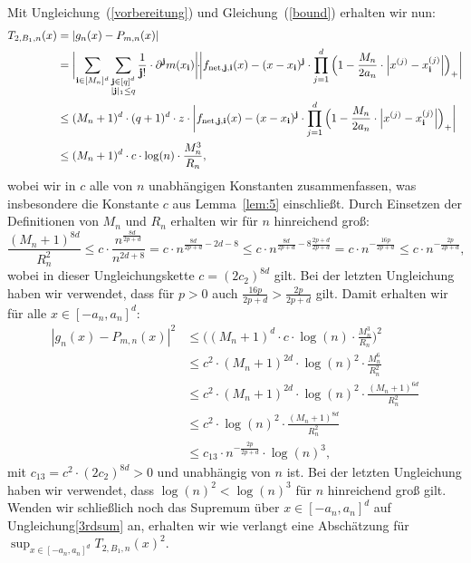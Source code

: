 Mit Ungleichung~(\ref{vorbereitung}) und Gleichung~(\ref{bound}) erhalten wir nun:
\begin{equation}
\label{1stsum}
\begin{split}
T_{2,B_1,n}(x) & = |g_n(x) - P_{m,n}(x)| \\
& = \bigg|\! \sum_{\mathbf{i} \in [M_n]^d} \sum_{\substack{ \mathbf{j} \in [q]^d \\ |\mathbf{j}|_1 \leq q}} \frac{1}{\mathbf{j}!} \cdot \partial^{\mathbf{j}} m (x_{\mathbf{i}}) \bigg|\!\! \cdot \!\!\bigg| f_{\mathrm{net},\mathbf{j},\mathbf{i}}(x) - (x - x_{\mathbf{i}})^{\mathbf{j}} \cdot \prod_{j = 1}^d\Big(1 - \frac{M_n}{2a_n} \cdot \Big|x^{(j)} - x_{\mathbf{i}}^{(j)}\Big|\Big)_+ \bigg| \\
& \leq (M_n + 1)^d \cdot (q + 1)^d \cdot z \cdot \bigg| f_{\mathrm{net},\mathbf{j},\mathbf{i}}(x) - (x - x_{\mathbf{i}})^{\mathbf{j}} \cdot \prod_{j = 1}^d\Big(1 - \frac{M_n}{2a_n} \cdot \Big|x^{(j)} - x_{\mathbf{i}}^{(j)}\Big|\Big)_+ \bigg| \\
& \leq  (M_n + 1)^d \cdot c\cdot \log(n) \cdot \frac{M_n^3}{R_n},
\end{split}
\end{equation}
wobei wir in $c$ alle von $n$ unabhängigen Konstanten zusammenfassen, was insbesondere die Konstante $c$ aus Lemma~\ref{lem:5} einschließt.
Durch Einsetzen der Definitionen von $M_n$ und $R_n$ erhalten wir für $n$ hinreichend groß:
$$
\frac{(M_n + 1)^{8d}}{R_n^2} \leq c \cdot \frac{n^{\frac{8d}{2p + d}}}{n^{2d + 8}} = c \cdot n^{\frac{8d}{2p + d} - 2d -8} \leq c \cdot n^{\frac{8d}{2p + d}  -8\frac{2p + d}{2p + d}} = c \cdot n^{-\frac{16p}{2p + d}} \leq c \cdot n^{-\frac{2p}{2p + d}},
$$
wobei in dieser Ungleichungskette $c = (2c_2)^{8d}$ gilt.
Bei der letzten Ungleichung haben wir verwendet, dass für $p > 0$ auch $\frac{16p}{2p + d} > \frac{2p}{2p + d}$ gilt. Damit erhalten wir für alle $x \in [-a_n,a_n]^d$:
\begin{equation}
\label{3rdsum}
\begin{split}
|g_n(x) - P_{m,n}(x)|^2 & \leq \bigg((M_n + 1)^d \cdot c \cdot \log(n) \cdot \frac{M_n^3}{R_n}\bigg)^2 \\
& \leq c^2 \cdot (M_n + 1)^{2d} \cdot \log(n)^2 \cdot \frac{M_n^6}{R_n^2} \\
& \leq  c^2 \cdot (M_n + 1)^{2d} \cdot \log(n)^2 \cdot \frac{(M_n + 1)^{6d}}{R_n^2} \\
& \leq  c^2 \cdot \log(n)^2 \cdot \frac{(M_n + 1)^{8d}}{R_n^2} \\
& \leq c_{13} \cdot n^{-\frac{2p}{2p + d}} \cdot \log(n)^3,
\end{split}
\end{equation}
mit $c_{13} = c^2 \cdot (2c_2)^{8d} > 0$ und unabhängig von $n$ ist. Bei der letzten Ungleichung haben wir verwendet, dass $\log(n)^2 < \log(n)^3$ für $n$ hinreichend groß gilt. Wenden wir schließlich noch das Supremum über $x \in [-a_n, a_n]^d$ auf Ungleichung\eqref{3rdsum} an, erhalten wir wie verlangt eine Abschätzung für $\sup_{x \in [-a_n, a_n]^d} T_{2,B_1,n}(x)^2$.

